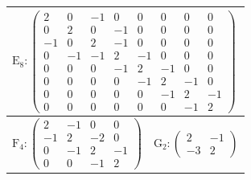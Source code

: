 \documentclass[10pt]{article}
\begin{document}
\begin{center}
\begin{tabular}{|l|l|l|l|l|l|l|l|l|l|}
\hline
\multicolumn{10}{|l|}{$\mathrm{E}_{8}:\left(\begin{array}{rrrrrrrr}2 & 0 & -1 & 0 & 0 & 0 & 0 & 0 \\ 0 & 2 & 0 & -1 & 0 & 0 & 0 & 0 \\ -1 & 0 & 2 & -1 & 0 & 0 & 0 & 0 \\ 0 & -1 & -1 & 2 & -1 & 0 & 0 & 0 \\ 0 & 0 & 0 & -1 & 2 & -1 & 0 & 0 \\ 0 & 0 & 0 & 0 & -1 & 2 & -1 & 0 \\ 0 & 0 & 0 & 0 & 0 & -1 & 2 & -1 \\ 0 & 0 & 0 & 0 & 0 & 0 & -1 & 2\end{array}\right)$} \\
\hline
\multicolumn{10}{|l|}{$\mathrm{F}_{4}:\left(\begin{array}{rrrr}2 & -1 & 0 & 0 \\ -1 & 2 & -2 & 0 \\ 0 & -1 & 2 & -1 \\ 0 & 0 & -1 & 2\end{array}\right) \quad \mathrm{G}_{2}:\left(\begin{array}{rr}2 & -1 \\ -3 & 2\end{array}\right)$} \\
\hline
\end{tabular}
\end{center}
\end{document}
